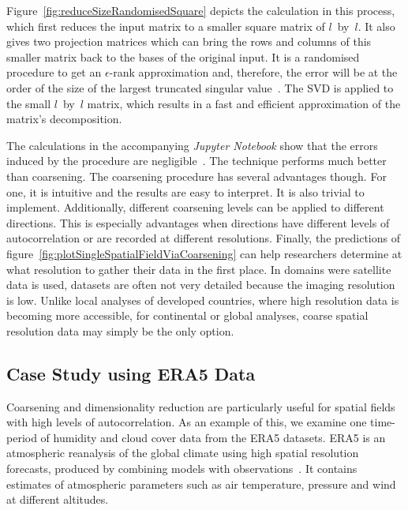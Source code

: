 \documentclass[ijgi,article,submit,moreauthors,pdftex,10pt,a4paper]{Definitions/mdpi}
\begin{document}
Figure~\ref{fig:reduceSizeRandomisedSquare} depicts the calculation in this process, which first reduces the input matrix to a smaller square matrix of $l$~by~$l$. It also gives two projection matrices which can bring the rows and columns of this smaller matrix back to the bases of the original input. It is a randomised procedure to get an $\epsilon$-rank approximation and, therefore, the error will be at the order of the size of the largest truncated singular value~\cite{Martinsson2016, Halko2011}. The SVD is applied to the small $l$~by~$l$ matrix, which results in a fast and efficient approximation of the matrix's decomposition.

The calculations in the accompanying \textit{Jupyter Notebook} show that the errors induced by the procedure are negligible~\cite{Bogaardt2018}. The technique performs much better than coarsening. The coarsening procedure has several advantages though. For one, it is intuitive and the results are easy to interpret. It is also trivial to implement. Additionally, different coarsening levels can be applied to different directions. This is especially advantages when directions have different levels of autocorrelation or are recorded at different resolutions. Finally, the predictions of figure~\ref{fig:plotSingleSpatialFieldViaCoarsening} can help researchers determine at what resolution to gather their data in the first place. In domains were satellite data is used, datasets are often not very detailed because the imaging resolution is low. Unlike local analyses of developed countries, where high resolution data is becoming more accessible, for continental or global analyses, coarse spatial resolution data may simply be the only option.

\subsection{Case Study using ERA5 Data}
\label{sec:Results/Case Study using ERA5 Data}

Coarsening and dimensionality reduction are particularly useful for spatial fields with high levels of autocorrelation. As an example of this, we examine one time-period of humidity and cloud cover data from the ERA5 datasets. ERA5 is an atmospheric reanalysis of the global climate using high spatial resolution forecasts, produced by combining models with observations~\cite{Dee2011}. It contains estimates of atmospheric parameters such as air temperature, pressure and wind at different altitudes.
\end{document}
